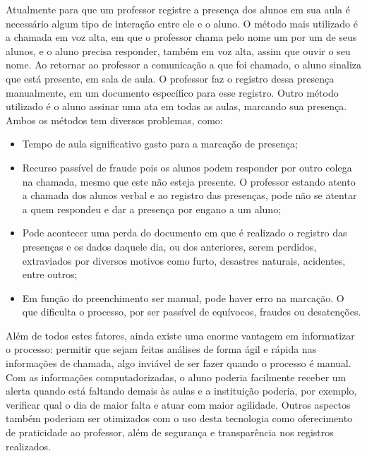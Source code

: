 \documentclass[
	12pt,
	oneside,
	a4paper,
	english,
	brazil,
]{abntex2}
\begin{document}
Atualmente para que um professor registre a presença dos alunos em sua aula é necessário algum tipo de interação entre ele e o aluno. O método mais utilizado é a chamada em voz alta, em que o professor chama pelo nome um por um de seus alunos, e o aluno precisa responder, também em voz alta, assim que ouvir o seu nome. Ao retornar ao professor a comunicação a que foi chamado, o aluno sinaliza que está presente, em sala de aula. O professor faz o registro dessa presença manualmente, em um documento específico para esse registro. Outro método utilizado é o aluno assinar uma ata em todas as aulas, marcando sua presença. Ambos os métodos tem diversos problemas, como:

\begin{itemize}
    \item Tempo de aula significativo gasto para a marcação de presença;
    \item Recurso passível de fraude pois os alunos podem responder por outro colega na chamada, mesmo que este não esteja presente. O professor estando atento a chamada dos alunos verbal e ao registro das presenças, pode não se atentar a quem respondeu e dar a presença por engano a um aluno;
    \item Pode acontecer uma perda do documento em que é realizado o registro das presenças e os dados daquele dia, ou dos anteriores, serem perdidos, extraviados por diversos motivos como furto, desastres naturais, acidentes, entre outros;
    \item Em função do preenchimento ser manual, pode haver erro na marcação. O que dificulta o processo, por ser passível de equívocos, fraudes ou desatenções.
\end{itemize}

Além de todos estes fatores, ainda existe uma enorme vantagem em informatizar o processo: permitir que sejam feitas análises de forma ágil e rápida nas informações de chamada, algo inviável de ser fazer quando o processo é manual. Com as informações computadorizadas, o aluno poderia facilmente receber um alerta quando está faltando demais às aulas e a instituição poderia, por exemplo, verificar qual o dia de maior falta e atuar com maior agilidade. Outros aspectos também poderiam ser otimizados com o uso desta tecnologia como oferecimento de praticidade ao professor, além de segurança e transparência nos registros realizados. 


\end{document}

